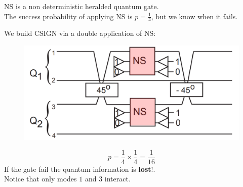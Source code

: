 \documentclass{beamer}
\begin{document}
\begin{frame}
\begin{center}

NS is a non deterministic heralded quantum gate.\\
\vspace{20pt}
The success probability of applying NS is $p = \frac{1}{4}$, but we know when it fails.

\end{center}
\end{frame}

\begin{frame}
\begin{center}

We build CSIGN via a double application of NS:

\begin{figure}[!htb]
\centering
\includegraphics[scale=.25]{immagini/csign.png}
\end{figure}
\begin{equation*}
p = \frac{1}{4} \times \frac{1}{4} = \frac{1}{16}
\end{equation*}
If the gate fail the quantum information is \textbf{lost}!.\\
Notice that only modes $1$ and $3$ interact.

\end{center}
\end{frame}
\end{document}

